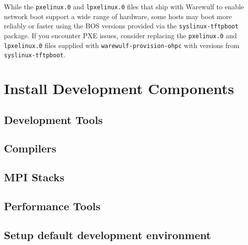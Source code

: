 \documentclass[letterpaper]{article}
\begin{document}

\begin{center}
\begin{tcolorbox}[]
\small While the \texttt{pxelinux.0} and \texttt{lpxelinux.0} files that ship
with Warewulf to enable network boot support a wide range of hardware, some
hosts may boot more reliably or faster using the BOS versions provided via the
\texttt{syslinux-tftpboot} package. If you encounter PXE issues, consider
replacing the \texttt{pxelinux.0} and \texttt{lpxelinux.0} files supplied with
\texttt{warewulf-provision-ohpc} with versions from \texttt{syslinux-tftpboot}.
\end{tcolorbox}
\end{center}

\section{Install \OHPC{} Development Components}


\subsection{Development Tools} \label{sec:install_dev_tools}


\subsection{Compilers} \label{sec:install_compilers}


\clearpage
\subsection{MPI Stacks} \label{sec:mpi}


\subsection{Performance Tools} \label{sec:install_perf_tools}


\subsection{Setup default development environment}


\end{document}

